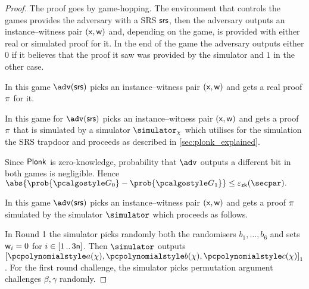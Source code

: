 \documentclass[runningheads,11pt]{llncs}
\begin{document}
\begin{proof}
  The proof goes by game-hopping. The environment that controls the games
  provides the adversary with a SRS $\mathsf{srs}$, then the adversary outputs an
  instance--witness pair $(\mathsf{x}, \mathsf{w})$ and, depending on the game, is provided
  with either real or simulated proof for it. In the end of the game the
  adversary outputs either $0$ if it believes that the proof it saw was provided
  by the simulator and $1$ in the other case.

   In this game $\adv(\srs)$ picks an instance--witness pair
  $(\mathsf{x}, \mathsf{w})$ and gets a real proof $\pi$ for it.

   In this game for $\adv(\srs)$ picks an instance--witness pair
  $(\mathsf{x}, \mathsf{w})$ and gets a proof $\pi$ that is simulated by a simulator
  $\simulator_\chi$ which utilises for the simulation the SRS trapdoor and
  proceeds as described in \cref{sec:plonk_explained}.

   Since $\textnormal{\textsf{Plonk}}$ is zero-knowledge,
  probability that $\adv$ outputs a different bit in both games is negligible.
  Hence
  \(
	\abs{\prob{\game{0}} - \prob{\game{1}}} \leq \epszk(\secpar).
\)

 In this game $\adv(\srs)$ picks an instance--witness pair
$(\mathsf{x}, \mathsf{w})$ and gets a proof $\pi$ simulated by the simulator
$\simulator$ which proceeds as follows.

In Round 1 the simulator  picks randomly both the randomisers $b_1, \ldots, b_6$ and
sets $\mathsf{w}_i = 0$ for $i \in [1 \, .. \, 3\mathsf{n}]$. Then $\simulator$
outputs $\gone{\p{a}(\chi), \p{b}(\chi), \p{c}(\chi)}$. For the first round
challenge, the simulator picks permutation argument challenges $\beta, \gamma$
randomly.


\end{proof}
\end{document}
